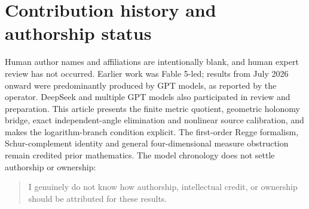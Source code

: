 \documentclass[11pt]{article}
\theoremstyle{definition}
\theoremstyle{remark}
\begin{document}
\section*{Contribution history and authorship status}
Human author names and affiliations are intentionally blank, and human expert review has not occurred.
Earlier work was Fable 5-led; results from July 2026 onward were predominantly produced by GPT models, as reported by the operator.
DeepSeek and multiple GPT models also participated in review and preparation.
This article presents the finite metric quotient, geometric holonomy bridge, exact independent-angle elimination and nonlinear source calibration, and makes the logarithm-branch condition explicit.
The first-order Regge formalism, Schur-complement identity and general four-dimensional measure obstruction remain credited prior mathematics.
The model chronology does not settle authorship or ownership:
\begin{quote}
I genuinely do not know how authorship, intellectual credit, or ownership should be attributed for these results.
\end{quote}


\end{document}

